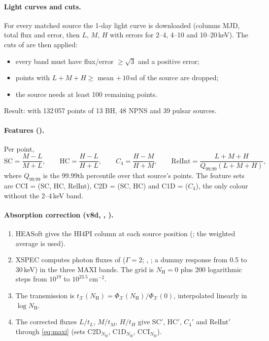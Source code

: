 \paragraph{Light curves and cuts.} For every matched source the 1-day light curve
 is downloaded (columns MJD, total flux and error, then $L$, $M$, $H$ with errors for 2--4,
4--10 and 10--20\,keV). The cuts of \citet{deBeurs2022} are then applied:
\begin{itemize}
\item every band must have flux/error $\ge\sqrt3$ and a positive error;
\item points with $L+M+H\ge$ mean $+\,10$\,sd of the source are dropped;
\item the source needs at least 100 remaining points.
\end{itemize}
Result:  with 132\,057 points of 13 BH, 48 NPNS and 39 pulsar sources.

\paragraph{Features ().} Per point,
\begin{equation}
\mathrm{SC}=\frac{M-L}{M+L},\qquad\mathrm{HC}=\frac{H-L}{H+L},\qquad C_4=\frac{H-M}{H+M},\qquad
\mathrm{RelInt}=\frac{L+M+H}{Q_{99.99}(L+M+H)},\label{eq:maxi}
\end{equation}
where $Q_{99.99}$ is the 99.99th percentile over that source's points. The feature sets are CCI = (SC, HC, RelInt),
C2D = (SC, HC) and C1D = ($C_4$), the only colour without the 2--4\,keV band.

\paragraph{Absorption correction (v8d, , ).}
\begin{enumerate}
\item HEASoft  gives the HI4PI column at each source position (; the weighted average
 is used).
\item XSPEC computes photon fluxes of  ($\Gamma=2$; , ; a dummy
response from 0.5 to 30\,keV) in the three MAXI bands. The grid is $N_\mathrm{H}=0$ plus 200 logarithmic steps from
$10^{19}$ to $10^{23.5}$\,cm$^{-2}$.
\item The transmission is $t_\mathcal X(N_\mathrm H)=\Phi_\mathcal X(N_\mathrm H)/\Phi_\mathcal X(0)$, interpolated linearly
in $\log N_\mathrm H$.
\item The corrected fluxes $L/t_L$, $M/t_M$, $H/t_H$ give SC$'$, HC$'$, $C_4'$ and RelInt$'$ through \cref{eq:maxi} (sets
C2D$_{N_\mathrm H}$, C1D$_{N_\mathrm H}$, CCI$_{N_\mathrm H}$).
\end{enumerate}

